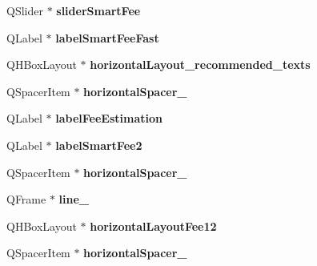\begin{DoxyCompactItemize}
\mbox{\label{class_ui___send_coins_dialog_a08d5152dd2fe1046c96991292f5bf02d}} 
Q\+Slider $\ast$ {\bfseries slider\+Smart\+Fee}
\item 
\mbox{\label{class_ui___send_coins_dialog_a0da6ea127701932681d1d134ee7824c2}} 
Q\+Label $\ast$ {\bfseries label\+Smart\+Fee\+Fast}
\item 
\mbox{\label{class_ui___send_coins_dialog_a20dce7ea7a8961234d39dfdcb4e8da97}} 
Q\+H\+Box\+Layout $\ast$ {\bfseries horizontal\+Layout\+\_\+recommended\+\_\+texts}
\item 
\mbox{\label{class_ui___send_coins_dialog_aae9704595733ba354a2e22eff5377e1d}} 
Q\+Spacer\+Item $\ast$ {\bfseries horizontal\+Spacer\+\_}
\item 
\mbox{\label{class_ui___send_coins_dialog_ae191bd08060a26d8828fd628d6b9674a}} 
Q\+Label $\ast$ {\bfseries label\+Fee\+Estimation}
\item 
\mbox{\label{class_ui___send_coins_dialog_abd2ba8262d45562c2db75e14fa3a4851}} 
Q\+Label $\ast$ {\bfseries label\+Smart\+Fee2}
\item 
\mbox{\label{class_ui___send_coins_dialog_a49216b798b66b97540747a5a992d651e}} 
Q\+Spacer\+Item $\ast$ {\bfseries horizontal\+Spacer\+\_}
\item 
\mbox{\label{class_ui___send_coins_dialog_a4cddd02ce9bdd0c9fdb10bde4810e1af}} 
Q\+Frame $\ast$ {\bfseries line\+\_}
\item 
\mbox{\label{class_ui___send_coins_dialog_a874bc1205073cb204f1a4107ebd77b1c}} 
Q\+H\+Box\+Layout $\ast$ {\bfseries horizontal\+Layout\+Fee12}
\item 
\mbox{\label{class_ui___send_coins_dialog_a2b9103641901802f53274475d8a84648}} 
Q\+Spacer\+Item $\ast$ {\bfseries horizontal\+Spacer\+\_}
\item 
\mbox{\label{class_ui___send_coins_dialog_ad647285e3caaebcc39d9a51882eb9672}} 

\end{DoxyCompactItemize}
